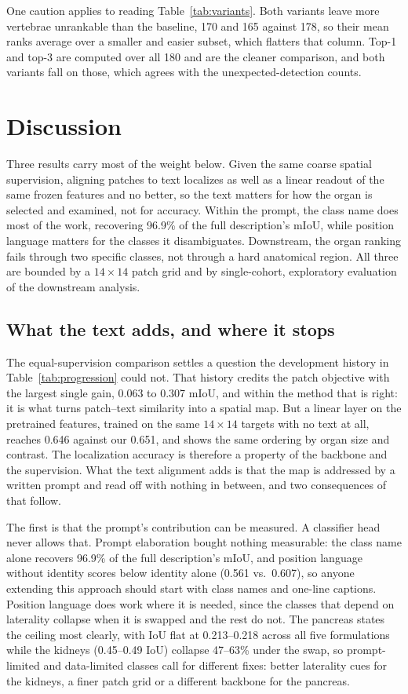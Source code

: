 \documentclass[10pt]{article}
\begin{document}
One caution applies to reading Table~\ref{tab:variants}. Both variants leave more
vertebrae unrankable than the baseline, 170 and 165 against 178, so their mean
ranks average over a smaller and easier subset, which flatters that column. Top-1
and top-3 are computed over all 180 and are the cleaner comparison, and both
variants fall on those, which agrees with the unexpected-detection counts.

\section{Discussion}
\label{sec:discussion}

Three results carry most of the weight below. Given the same coarse spatial
supervision, aligning patches to text localizes as well as a linear readout of
the same frozen features and no better, so the text matters for how the organ is
selected and examined, not for accuracy. Within the prompt, the class name does
most of the work, recovering 96.9\% of the full description's mIoU, while
position language matters for the classes it disambiguates. Downstream, the
organ ranking fails through two specific classes, not through a hard
anatomical region. All three are bounded by a $14\times14$ patch grid and by
single-cohort, exploratory evaluation of the downstream analysis.

\subsection{What the text adds, and where it stops}

The equal-supervision comparison settles a question the development history in
Table~\ref{tab:progression} could not. That history credits the patch objective
with the largest single gain, 0.063 to 0.307 mIoU, and within the method that is
right: it is what turns patch--text similarity into a spatial map. But a linear
layer on the pretrained features, trained on the same $14\times14$ targets with no
text at all, reaches 0.646 against our 0.651, and shows the same ordering by organ
size and contrast. The localization accuracy is therefore a property of the
backbone and the supervision. What the text alignment adds is that the map is
addressed by a written prompt and read off with nothing in between, and two
consequences of that follow.

The first is that the prompt's contribution can be measured. A classifier head never allows that. Prompt elaboration bought nothing measurable: the class name
alone recovers 96.9\% of the full description's mIoU, and position language
without identity scores below identity alone (0.561 vs.\ 0.607), so anyone
extending this approach should start with class names and one-line captions.
Position language does work where it is needed, since the classes that depend on
laterality collapse when it is swapped and the rest do not. The pancreas states
the ceiling most clearly, with IoU flat at 0.213--0.218 across all five
formulations while the kidneys (0.45--0.49 IoU) collapse 47--63\% under the swap,
so prompt-limited and data-limited classes call for different fixes: better
laterality cues for the kidneys, a finer patch grid or a different backbone for the
pancreas.
\end{document}
